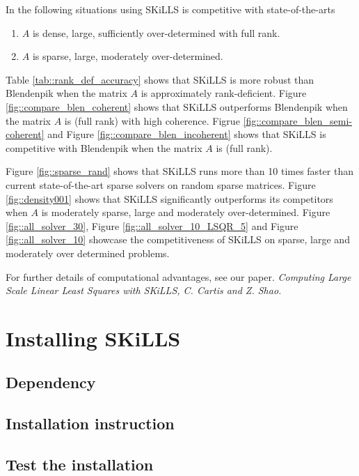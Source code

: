 \documentclass[english,11pt]{article}
\begin{document}
In the following situations using SKiLLS is competitive with state-of-the-arts

\begin{enumerate}\setlength{\itemsep}{-2pt}
	\item $A$ is dense, large, sufficiently over-determined with full rank. 

	\item $A$ is sparse, large, moderately over-determined. 
\end{enumerate}

Table \ref{tab::rank_def_accuracy} shows that SKiLLS is more robust than Blendenpik when the matrix $A$ is approximately rank-deficient. Figure \ref{fig::compare_blen_coherent} shows that SKiLLS outperforms Blendenpik when the matrix $A$ is (full rank) with high coherence. Figrue \ref{fig::compare_blen_semi-coherent} and Figure \ref{fig::compare_blen_incoherent} shows that SKiLLS is competitive with Blendenpik when the matrix $A$ is (full rank). 

Figure \ref{fig::sparse_rand} shows that SKiLLS runs more than 10 times faster than current state-of-the-art sparse solvers on random sparse matrices. Figure \ref{fig::density001} shows that SKiLLS significantly outperforms its competitors when $A$ is moderately sparse, large and moderately over-determined.  Figure \ref{fig::all_solver_30}, Figure \ref{fig::all_solver_10_LSQR_5} and Figure \ref{fig::all_solver_10} showcase the competitiveness of SKiLLS on sparse, large and moderately over determined problems. 








For further details of computational advantages, see our paper. \it{Computing Large Scale Linear Least Squares with SKiLLS, C. Cartis and Z. Shao}.

\section{Installing SKiLLS}
\subsection{Dependency}
\subsection{Installation instruction}
\subsection{Test the installation}
\end{document}
